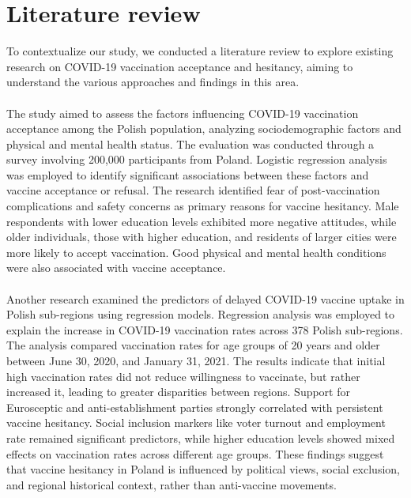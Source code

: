 \documentclass[a4paper,12pt]{article} %
\begin{document}
\section{Literature review}
To contextualize our study, we conducted a literature review to explore existing research on COVID-19 vaccination acceptance and hesitancy, aiming to understand the various approaches and findings in this area.
\\
\\
The study \cite{vaccines11030700} aimed to assess the factors influencing COVID-19 vaccination acceptance among the Polish population, analyzing sociodemographic factors and physical and mental health status. The evaluation was conducted through a survey involving 200,000 participants from Poland. Logistic regression analysis was employed to identify significant associations between these factors and vaccine acceptance or refusal. The research identified fear of post-vaccination complications and safety concerns as primary reasons for vaccine hesitancy. Male respondents with lower education levels exhibited more negative attitudes, while older individuals, those with higher education, and residents of larger cities were more likely to accept vaccination. Good physical and mental health conditions were also associated with vaccine acceptance.
\\
\\
Another research \cite{vaccines10040528} examined the predictors of delayed COVID-19 vaccine uptake in Polish sub-regions using regression models. Regression analysis was employed to explain the increase in COVID-19 vaccination rates across 378 Polish sub-regions. The analysis compared vaccination rates for age groups of 20 years and older between June 30, 2020, and January 31, 2021. The results indicate that initial high vaccination rates did not reduce willingness to vaccinate, but rather increased it, leading to greater disparities between regions. Support for Eurosceptic and anti-establishment parties strongly correlated with persistent vaccine hesitancy. Social inclusion markers like voter turnout and employment rate remained significant predictors, while higher education levels showed mixed effects on vaccination rates across different age groups. These findings suggest that vaccine hesitancy in Poland is influenced by political views, social exclusion, and regional historical context, rather than anti-vaccine movements.
\\
\\
\end{document}
